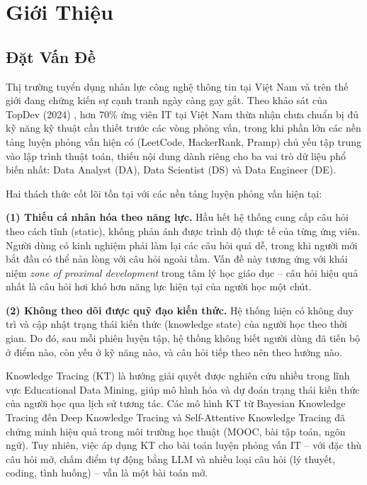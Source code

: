 \chapter{Giới Thiệu}
\label{chap:intro}

\section{Đặt Vấn Đề}
\label{sec:motivation}

Thị trường tuyển dụng nhân lực công nghệ thông tin tại Việt Nam và trên thế giới đang chứng kiến sự cạnh tranh ngày càng gay gắt. Theo khảo sát của TopDev (2024) \cite{topdev2024}, hơn 70\% ứng viên IT tại Việt Nam thừa nhận chưa chuẩn bị đủ kỹ năng kỹ thuật cần thiết trước các vòng phỏng vấn, trong khi phần lớn các nền tảng luyện phỏng vấn hiện có (LeetCode, HackerRank, Pramp) chủ yếu tập trung vào lập trình thuật toán, thiếu nội dung dành riêng cho ba vai trò dữ liệu phổ biến nhất: Data Analyst (DA), Data Scientist (DS) và Data Engineer (DE).

Hai thách thức cốt lõi tồn tại với các nền tảng luyện phỏng vấn hiện tại:

\textbf{(1) Thiếu cá nhân hóa theo năng lực.} Hầu hết hệ thống cung cấp câu hỏi theo cách tĩnh (static), không phản ánh được trình độ thực tế của từng ứng viên. Người dùng có kinh nghiệm phải làm lại các câu hỏi quá dễ, trong khi người mới bắt đầu có thể nản lòng với câu hỏi ngoài tầm. Vấn đề này tương ứng với khái niệm \textit{zone of proximal development} trong tâm lý học giáo dục \cite{vygotsky1978mind} -- câu hỏi hiệu quả nhất là câu hỏi hơi khó hơn năng lực hiện tại của người học một chút.

\textbf{(2) Không theo dõi được quỹ đạo kiến thức.} Hệ thống hiện có không duy trì và cập nhật trạng thái kiến thức (knowledge state) của người học theo thời gian. Do đó, sau mỗi phiên luyện tập, hệ thống không biết người dùng đã tiến bộ ở điểm nào, còn yếu ở kỹ năng nào, và câu hỏi tiếp theo nên theo hướng nào.

Knowledge Tracing (KT) \cite{corbett1994knowledge} là hướng giải quyết được nghiên cứu nhiều trong lĩnh vực Educational Data Mining, giúp mô hình hóa và dự đoán trạng thái kiến thức của người học qua lịch sử tương tác. Các mô hình KT từ Bayesian Knowledge Tracing \cite{corbett1994knowledge} đến Deep Knowledge Tracing \cite{piech2015deep} và Self-Attentive Knowledge Tracing \cite{pandey2019self} đã chứng minh hiệu quả trong môi trường học thuật (MOOC, bài tập toán, ngôn ngữ). Tuy nhiên, việc áp dụng KT cho bài toán luyện phỏng vấn IT -- với đặc thù câu hỏi mở, chấm điểm tự động bằng LLM và nhiều loại câu hỏi (lý thuyết, coding, tình huống) -- vẫn là một bài toán mở.

